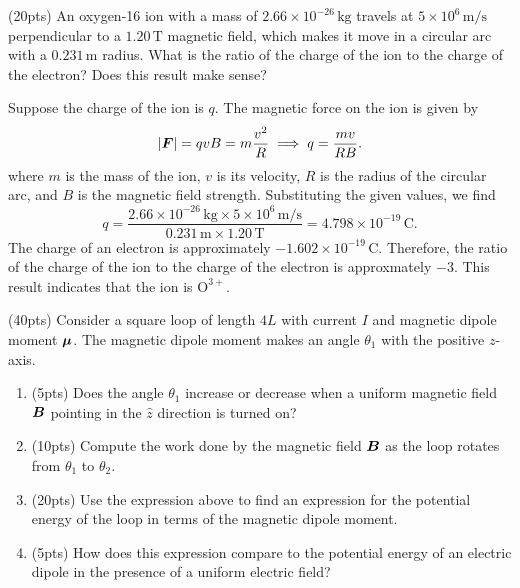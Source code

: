 \documentclass{article}
\begin{document}
\begin{problem}
(20pts) An oxygen-16 ion with a mass of $2.66 \times 10^{-26}\,\mathrm{kg}$ travels at $5 \times 10^{6}\,\mathrm{m/s}$ perpendicular to a $1.20\,\mathrm{T}$ magnetic field, which makes it move in a circular arc with a $0.231\,\mathrm{m}$ radius. What is the ratio of the charge of the ion to the charge of the electron? Does this result make sense?
\end{problem}

\begin{solution}
  Suppose the charge of the ion is $q$. The magnetic force on the ion is given by
  \[ \left|\boldsymbol{F}\right|=qvB=m\frac{v^2}{R}
  \implies q=\frac{mv}{RB}. \]
  where $m$ is the mass of the ion, $v$ is its velocity, $R$ is the radius of the circular arc, and $B$ is the magnetic field strength. Substituting the given values, we find
  \[ q=\frac{2.66\times 10^{-26}\,\mathrm{kg}\times 5\times 10^{6}\,\mathrm{m/s}}{0.231\,\mathrm{m}\times 1.20\,\mathrm{T}}
  = 4.798\times 10^{-19}\,\mathrm{C}. \]
  The charge of an electron is approximately $-1.602 \times 10^{-19}\,\mathrm{C}$. Therefore, the ratio of the charge of the ion to the charge of the electron is approxmately \( -3 \). This result indicates that the ion is \( \mathrm{O}^{3+} \).
\end{solution}



\begin{problem}
(40pts) Consider a square loop of length $4L$ with current $I$ and magnetic dipole moment $\boldsymbol{\mu}$. The magnetic dipole moment makes an angle $\theta_1$ with the positive $z$-axis.
\begin{enumerate}[label=(\alph*)]
	\item (5pts) Does the angle $\theta_1$ increase or decrease when a uniform magnetic field $\boldsymbol{B}$ pointing in the $\hat{z}$ direction is turned on?
	\item (10pts) Compute the work done by the magnetic field $\boldsymbol{B}$ as the loop rotates from $\theta_1$ to $\theta_2$.
	\item (20pts) Use the expression above to find an expression for the potential energy of the loop in terms of the magnetic dipole moment.
	\item (5pts) How does this expression compare to the potential energy of an electric dipole in the presence of a uniform electric field?
\end{enumerate}
\end{problem}
\end{document}
